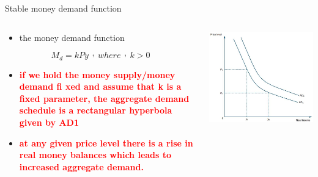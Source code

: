 \documentclass[10pt,hyperref={CJKbookmarks=true},xcolor=dvipsnames,aspectratio=169]{beamer}
\begin{document}
\begin{frame}{Stable money demand function}


\begin{columns}[onlytextwidth]
\begin{column}{0.5\textwidth}
\begin{itemize}
\item the money demand function
\end{itemize}

\[
M_{d}=kPy\begin{array}{c}
,\end{array}where\begin{array}{c}
,\end{array}k>0
\]

\begin{itemize}
\item \textbf{\textcolor{red}{if we hold the money supply/money demand fi
xed and assume that k is a fixed parameter, the aggregate demand schedule
is a rectangular hyperbola given by AD1}}
\item \textbf{\textcolor{red}{at any given price level there is a rise in
real money balances which leads to increased aggregate demand.}}
\end{itemize}

\end{column}
\begin{column}{0.5\textwidth}
\includegraphics[width=\columnwidth]{fig/boptheory/lec08-14}
\end{column}
\end{columns}

\end{frame}
\end{document}
